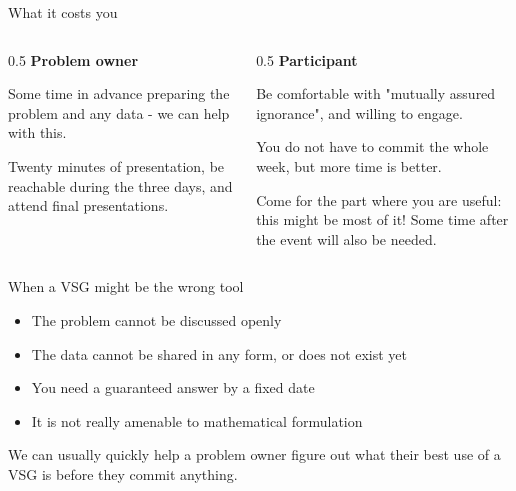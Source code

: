 \documentclass[aspectratio=169,11pt]{beamer}
\begin{document}
\begin{frame}{What it costs you}
  \begin{columns}[T]
    \begin{column}{0.5\textwidth}
      \textbf{Problem owner}

      \vspace{0.8em}
      Some time in advance preparing the problem and any data - we can help with this.  
      
      \vspace{0.8em}
      Twenty minutes of presentation, be reachable during the three days, and attend final presentations.

      \vspace{0.8em}
    \end{column}
    \begin{column}{0.5\textwidth}
      \textbf{Participant}

      \vspace{0.8em}
      
      Be comfortable with "mutually assured ignorance", and willing to engage.
      
       \vspace{0.8em}
      You do not have to commit the whole week, but more time is better.

      \vspace{0.8em}
      Come for the part where you are useful: this might be most of it!  Some time after the event will also be needed.
    \end{column}
  \end{columns}
\end{frame}

\begin{frame}{When a VSG might be the wrong tool}
  \begin{itemize}
    \item The problem cannot be discussed openly
    \item The data cannot be shared in any form, or does not exist yet
    \item You need a guaranteed answer by a fixed date
    \item It is not really amenable to mathematical formulation 
  \end{itemize}
  \vfill
  We can usually quickly help a problem owner figure out what their best use of a VSG is
  before they commit anything.
\end{frame}
\end{document}
